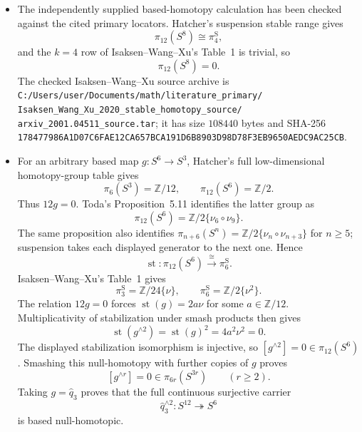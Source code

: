 \begin{itemize}[leftmargin=1.8em]
\item The independently supplied based-homotopy calculation has been checked
against the cited primary locators.  Hatcher's suspension stable range
\cite[Corollary~4.24, p.~360]{Hatcher2002} gives
\[
 \pi_{12}(S^8)\cong\pi_4^{\mathrm S},
\]
and the \(k=4\) row of Isaksen--Wang--Xu's Table~1
\cite[p.~113]{IsaksenWangXu2023} is trivial, so
\[
 \pi_{12}(S^8)=0.
\]
The checked Isaksen--Wang--Xu source archive is
\texttt{C:/Users/user/Documents/math/literature\_primary/}%
\texttt{Isaksen\_Wang\_Xu\_2020\_stable\_homotopy\_source/}%
\texttt{arxiv\_2001.04511\_source.tar}; it has size \(108440\) bytes and
SHA-256
\texttt{178477986A1D07C6FAE12CA657BCA191D6B8903D98D78F3EB9650AEDC9AC25CB}.

\item For an arbitrary based map \(g:S^6\to S^3\), Hatcher's full
low-dimensional homotopy-group table \cite[p.~339]{Hatcher2002} gives
\[
 \pi_6(S^3)=\mathbb Z/12,\qquad
 \pi_{12}(S^6)=\mathbb Z/2.
\]
Thus \(12g=0\).  Toda's Proposition~5.11
\cite[Proposition~5.11]{Toda1962} identifies the latter group as
\[
 \pi_{12}(S^6)=\mathbb Z/2\{\nu_6\circ\nu_9\}.
\]
The same proposition also identifies
\(\pi_{n+6}(S^n)=\mathbb Z/2\{\nu_n\circ\nu_{n+3}\}\) for \(n\geq5\);
suspension takes each displayed generator to the next one.  Hence
\[
 \operatorname{st}:\pi_{12}(S^6)\xrightarrow{\ \cong\ }\pi_6^{\mathrm S}.
\]
Isaksen--Wang--Xu's Table~1 gives
\[
 \pi_3^{\mathrm S}=\mathbb Z/24\{\nu\},\qquad
 \pi_6^{\mathrm S}=\mathbb Z/2\{\nu^2\}.
\]
The relation \(12g=0\) forces
\(\operatorname{st}(g)=2a\nu\) for some \(a\in\mathbb Z/12\).
Multiplicativity of stabilization under smash products then gives
\[
 \operatorname{st}(g^{\wedge2})
 =\operatorname{st}(g)^2
 =4a^2\nu^2=0.
\]
The displayed stabilization isomorphism is injective, so
\([g^{\wedge2}]=0\in\pi_{12}(S^6)\).  Smashing this null-homotopy with
further copies of \(g\) proves
\[
 [g^{\wedge r}]=0\in\pi_{6r}(S^{3r})\qquad(r\geq2).
\]
Taking \(g=\widehat q_3\) proves that the full continuous surjective
carrier
\[
 \widehat q_3^{\wedge2}:S^{12}\twoheadrightarrow S^6
\]
is based null-homotopic.


\end{itemize}
